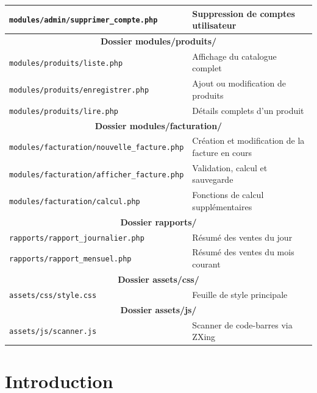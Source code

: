 \documentclass[12pt,a4paper]{article}
\begin{document}
\begin{table}[h]
\begin{tabular}{|l|p{8cm}|}
\hline
\texttt{modules/admin/supprimer\_compte.php} & Suppression de comptes utilisateur \\
\hline
\multicolumn{2}{|c|}{\textbf{Dossier modules/produits/}} \\
\hline
\texttt{modules/produits/liste.php} & Affichage du catalogue complet \\
\hline
\texttt{modules/produits/enregistrer.php} & Ajout ou modification de produits \\
\hline
\texttt{modules/produits/lire.php} & Détails complets d'un produit \\
\hline
\multicolumn{2}{|c|}{\textbf{Dossier modules/facturation/}} \\
\hline
\texttt{modules/facturation/nouvelle\_facture.php} & Création et modification de la facture en cours \\
\hline
\texttt{modules/facturation/afficher\_facture.php} & Validation, calcul et sauvegarde \\
\hline
\texttt{modules/facturation/calcul.php} & Fonctions de calcul supplémentaires \\
\hline
\multicolumn{2}{|c|}{\textbf{Dossier rapports/}} \\
\hline
\texttt{rapports/rapport\_journalier.php} & Résumé des ventes du jour \\
\hline
\texttt{rapports/rapport\_mensuel.php} & Résumé des ventes du mois courant \\
\hline
\multicolumn{2}{|c|}{\textbf{Dossier assets/css/}} \\
\hline
\texttt{assets/css/style.css} & Feuille de style principale \\
\hline
\multicolumn{2}{|c|}{\textbf{Dossier assets/js/}} \\
\hline
\texttt{assets/js/scanner.js} & Scanner de code-barres via ZXing \\
\hline
\end{tabular}
\end{table}
\section{Introduction}
\end{document}

